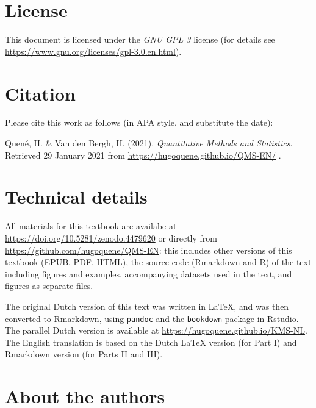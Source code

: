 \documentclass[
]{book}
\begin{document}
\hypertarget{license}{%
\section*{License}\label{license}}

This document is licensed under the \emph{GNU GPL 3} license (for details see
\url{https://www.gnu.org/licenses/gpl-3.0.en.html}).

\hypertarget{citation}{%
\section*{Citation}\label{citation}}

Please cite this work as follows (in APA style, and substitute the date):

Quené, H. \& Van den Bergh, H. (2021). \emph{Quantitative Methods and Statistics}.
Retrieved 29 January 2021 from \url{https://hugoquene.github.io/QMS-EN/} .

\hypertarget{technical-details}{%
\section*{Technical details}\label{technical-details}}

All materials for this textbook are availabe at
\url{https://doi.org/10.5281/zenodo.4479620} or directly from
\url{https://github.com/hugoquene/QMS-EN}:
this includes other versions of this textbook (EPUB, PDF, HTML), the source code (Rmarkdown and R) of the text including figures and examples, accompanying datasets used in the text, and figures as separate files.

The original Dutch version of this text was written in LaTeX, and was then converted to Rmarkdown, using \texttt{pandoc} \citep{pandoc} and the \texttt{bookdown} package \citep{R-bookdown} in \href{https://www.rstudio.com}{Rstudio}. The parallel Dutch version is available at \url{https://hugoquene.github.io/KMS-NL}.
The English translation is based on the Dutch LaTeX version (for Part I) and Rmarkdown version (for Parts II and III).

\hypertarget{about-the-authors}{%
\section*{About the authors}\label{about-the-authors}}
\end{document}
